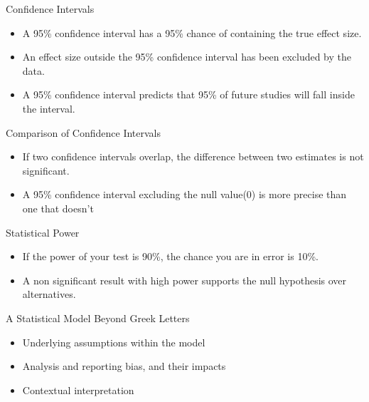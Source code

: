 \documentclass[aspectratio=169, 12pt]{beamer}
\begin{document}
\begin{frame}{Confidence Intervals} %
\begin{itemize}
    \item A 95\% confidence interval has a 95\% chance of containing the true effect size.
    \vspace{0.5cm}
    \item An effect size outside the 95\% confidence interval has been excluded by the data.
    \vspace{0.5cm}
    \item A 95\% confidence interval predicts that 95\% of future studies will fall inside the interval.
\end{itemize}
\end{frame}

\begin{frame}{Comparison of Confidence Intervals} %
\begin{itemize}
    \item If two confidence intervals overlap, the difference between two estimates is not significant.
    \vspace{0.5cm}
    \item A 95\% confidence interval excluding the null value(0) is more precise than one that doesn't
\end{itemize}
\end{frame}

\begin{frame}{Statistical Power} %
\begin{itemize}
    \item If the power of your test is 90\%, the chance you are in error is 10\%.
    \vspace{0.5cm}
    \item A non significant result with high power supports the null hypothesis over alternatives.
\end{itemize}
\end{frame}

\begin{frame}{A Statistical Model Beyond Greek Letters}
\begin{itemize}
    \item Underlying assumptions within the model
    \vspace{0.5cm}
    \item Analysis and reporting bias, and their impacts
    \vspace{0.5cm}
    \item Contextual interpretation
\end{itemize}
\end{frame}
\end{document}
